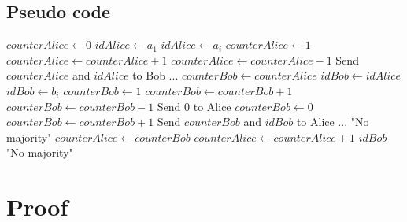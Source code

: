 \documentclass[11pt,a4paper]{article}
\begin{document}
\subsection{Pseudo code}
\begin{algorithmic}[1]
\State $counterAlice \gets 0$
\State $idAlice \gets a_1$
        \State $idAlice \gets a_i$
        \State $counterAlice \gets 1$
        \State $counterAlice \gets counterAlice + 1$
    \Else
        \State $counterAlice \gets counterAlice - 1$
    \EndIf
\EndFor
\State Send $counterAlice$ and $idAlice$ to Bob
\State ...
\State $counterBob \gets counterAlice$
\State $idBob \gets idAlice$
        \State $idBob \gets b_i$
        \State $counterBob \gets 1$
        \State $counterBob \gets counterBob + 1$
    \Else
        \State $counterBob \gets counterBob - 1$
    \EndIf
\EndFor
{}
    \State Send $0$ to Alice
\Else
    \State $counterBob \gets 0$
            \State $counterBob \gets counterBob + 1$
        \EndIf
    \EndFor
\EndIf
\State Send $counterBob$ and $idBob$ to Alice
\State ...
    \State \Return "No majority"
\Else
    \State $counterAlice \gets counterBob$
            \State $counterAlice \gets counterAlice + 1$
        \EndIf
    \EndFor
        \State \Return $idBob$
    \Else
        \State \Return "No majority"
    \EndIf
\EndIf
\end{algorithmic}

\section{Proof}

\vspace{2mm}\noindent{}
\end{document}
